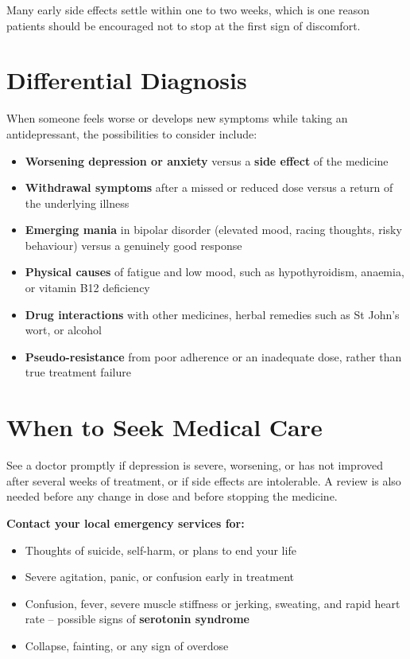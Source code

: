 Many early side effects settle within one to two weeks, which is one reason patients should be encouraged not to stop at the first sign of discomfort.

\section*{Differential Diagnosis}
When someone feels worse or develops new symptoms while taking an antidepressant, the possibilities to consider include:

\begin{itemize}
    \item \textbf{Worsening depression or anxiety} versus a \textbf{side effect} of the medicine
    \item \textbf{Withdrawal symptoms} after a missed or reduced dose versus a return of the underlying illness
    \item \textbf{Emerging mania} in bipolar disorder (elevated mood, racing thoughts, risky behaviour) versus a genuinely good response
    \item \textbf{Physical causes} of fatigue and low mood, such as hypothyroidism, anaemia, or vitamin B12 deficiency
    \item \textbf{Drug interactions} with other medicines, herbal remedies such as St John's wort, or alcohol
    \item \textbf{Pseudo-resistance} from poor adherence or an inadequate dose, rather than true treatment failure
\end{itemize}

\section*{When to Seek Medical Care}
See a doctor promptly if depression is severe, worsening, or has not improved after several weeks of treatment, or if side effects are intolerable. A review is also needed before any change in dose and before stopping the medicine.

\textbf{Contact your local emergency services for:}
\begin{itemize}
    \item Thoughts of suicide, self-harm, or plans to end your life
    \item Severe agitation, panic, or confusion early in treatment
    \item Confusion, fever, severe muscle stiffness or jerking, sweating, and rapid heart rate -- possible signs of \textbf{serotonin syndrome}
    \item Collapse, fainting, or any sign of overdose
\end{itemize}

